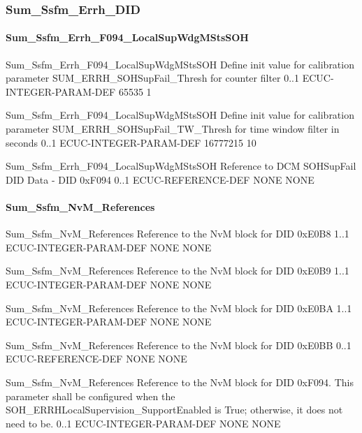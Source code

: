 \subsubsection{Sum_Ssfm_Errh_DID}
\paragraph{Sum_Ssfm_Errh_F094_LocalSupWdgMStsSOH}

{Sum_Ssfm_Errh_F094_LocalSupWdgMStsSOH}
{Define init value for calibration parameter SUM_ERRH_SOHSupFail_Thresh for counter filter}
{0..1}
{ECUC-INTEGER-PARAM-DEF}
{65535}
{1}

{Sum_Ssfm_Errh_F094_LocalSupWdgMStsSOH}
{Define init value for calibration parameter SUM_ERRH_SOHSupFail_TW_Thresh for time window filter in seconds}
{0..1}
{ECUC-INTEGER-PARAM-DEF}
{16777215}
{10}

{Sum_Ssfm_Errh_F094_LocalSupWdgMStsSOH}
{Reference to DCM SOHSupFail DID Data - DID 0xF094}
{0..1}
{ECUC-REFERENCE-DEF}
{NONE}
{NONE}

\paragraph{Sum_Ssfm_NvM_References}
{Sum_Ssfm_NvM_References}
{Reference to the NvM block for DID 0xE0B8}
{1..1}
{ECUC-INTEGER-PARAM-DEF}
{NONE}
{NONE}

{Sum_Ssfm_NvM_References}
{Reference to the NvM block for DID 0xE0B9}
{1..1}
{ECUC-INTEGER-PARAM-DEF}
{NONE}
{NONE}

{Sum_Ssfm_NvM_References}
{Reference to the NvM block for DID 0xE0BA}
{1..1}
{ECUC-INTEGER-PARAM-DEF}
{NONE}
{NONE}

{Sum_Ssfm_NvM_References}
{Reference to the NvM block for DID 0xE0BB}
{0..1}
{ECUC-REFERENCE-DEF}
{NONE}
{NONE}

{Sum_Ssfm_NvM_References}
{Reference to the NvM block for DID 0xF094. This parameter shall be configured when the SOH_ERRHLocalSupervision_SupportEnabled is True; otherwise, it does not need to be.}
{0..1}
{ECUC-INTEGER-PARAM-DEF}
{NONE}
{NONE}

